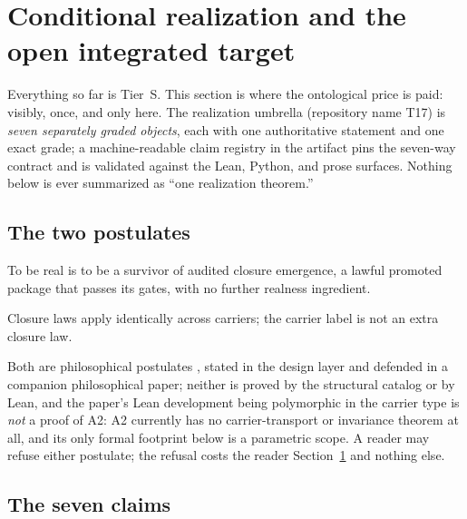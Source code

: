 \section{Conditional realization and the open integrated target}
\label{sec:t17}

Everything so far is Tier~S. This section is where the ontological price is
paid: visibly, once, and only here. The realization umbrella (repository
name T17) is \emph{seven separately graded objects}, each with one
authoritative statement and one exact grade; a machine-readable claim
registry in the artifact pins the seven-way contract and is validated against
the Lean, Python, and prose surfaces. Nothing below is ever summarized as
``one realization theorem.''

\subsection{The two postulates}

\begin{postulate}
\label{post:a1}
To be real is to be a survivor of audited closure emergence, a lawful
promoted package that passes its gates, with no further realness
ingredient.
\end{postulate}

\begin{postulate}
\label{post:a2}
Closure laws apply identically across carriers; the carrier label is not an
extra closure law.
\end{postulate}

Both are philosophical postulates \gradeO, stated in the design layer and
defended in a companion philosophical paper; neither is proved by the
structural catalog or by Lean, and the paper's Lean development being
polymorphic in the carrier type is \emph{not} a proof of A2: A2 currently
has no carrier-transport or invariance theorem at all, and its only formal
footprint below is a parametric scope. A reader may refuse either postulate;
the refusal costs the reader Section~\ref{sec:t17} and nothing else.

\subsection{The seven claims}

